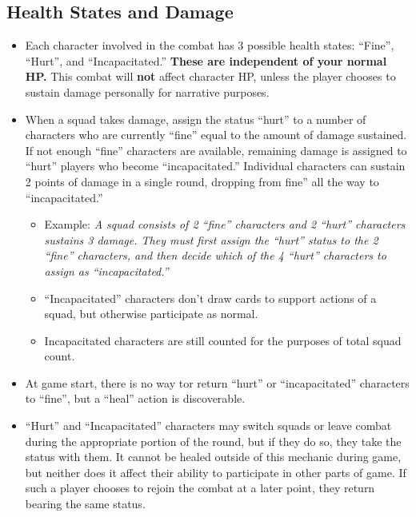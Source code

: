\documentclass[green]{gl2018}
\begin{document}
\subsection*{Health States and Damage}
\begin{itemize}
	\item Each character involved in the combat has 3 possible health states: ``Fine'', ``Hurt'', and ``Incapacitated.'' {\bf These are independent of your normal HP.} This combat will {\bf not} affect character HP, unless the player chooses to sustain damage personally for narrative purposes.
	\item When a squad takes damage, assign the status “hurt” to a number of characters who are currently ``fine'' equal to the amount of damage sustained. If not enough ``fine'' characters are available, remaining damage is assigned to ``hurt'' players who become ``incapacitated.'' Individual characters can sustain 2 points of damage in a single round, dropping from fine'' all the way to ``incapacitated.''
	\begin{itemize}
		\item Example: \emph{A squad consists of 2 ``fine'' characters and 2 ``hurt'' characters sustains 3 damage. They must first assign the ``hurt'' status to the 2 ``fine'' characters, and then decide which of the 4 ``hurt'' characters to assign as ``incapacitated.''}
		\item ``Incapacitated'' characters don’t draw cards to support actions of a squad, but otherwise participate as normal.
		\item Incapacitated characters are still counted for the purposes of total squad count.
	\end{itemize}
	\item At game start, there is no way tor return ``hurt'' or ``incapacitated'' characters to ``fine'', but a ``heal'' action is discoverable.
	\item ``Hurt'' and ``Incapacitated'' characters may switch squads or leave combat during the appropriate portion of the round, but if they do so, they take the status with them. It cannot be healed outside of this mechanic during game, but neither does it affect their ability to participate in other parts of game. If such a player chooses to rejoin the combat at a later point, they return bearing the same status.
\end{itemize}
\end{document}
